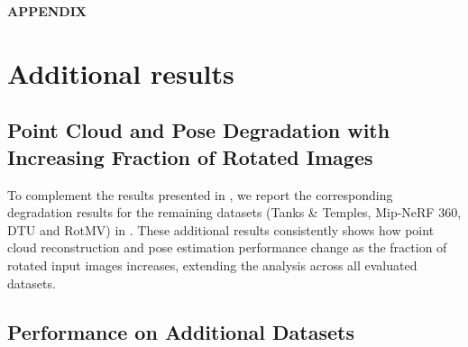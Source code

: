 
\clearpage
\appendix

\begin{center}
    {\large\bfseries APPENDIX}
\end{center}

\startcontents[appendix]

\renewcommand{\thepage}{\Alph{section}-\arabic{page}}
\renewcommand{\thesection}{\Alph{section}}
\renewcommand{\thefigure}{\Alph{figure}}
\renewcommand{\thetable}{\Alph{table}}

\setcounter{section}{0}
\setcounter{figure}{0}
\setcounter{table}{0}
\setcounter{page}{1}

\newpage
\section{Additional results}
\label{sec:additional_results_suppl}
\subsection{Point Cloud and Pose Degradation with Increasing Fraction of Rotated Images}
\label{sec:fraction_degradation}
To complement the results presented in , we report the corresponding degradation results for the remaining datasets (Tanks \& Temples, Mip-NeRF 360, DTU and RotMV) in . These additional results consistently shows how point cloud reconstruction and pose estimation performance change as the fraction of rotated input images increases, extending the analysis across all evaluated datasets.



\subsection{Performance on Additional Datasets}
\label{sec:remaining_results_suppl}

